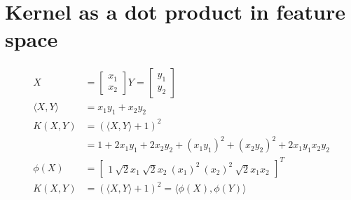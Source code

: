 \documentclass[12pt]{article}
\begin{document}
	\section{Kernel as a dot product in feature space}
	\begin{align*}
		X                    &= \begin{bmatrix}x_1\\x_2\end{bmatrix} Y = \begin{bmatrix}y_1\\y_2\end{bmatrix} \\ 
		\langle X, Y \rangle &= x_1y_1 + x_2y_2\\
		K(X,Y)               &= (\langle X, Y \rangle + 1) ^2 \\
		                     &= 1 + 2x_1y_1 + 2x_2y_2 + (x_1y_1)^2 + (x_2y_2)^2 + 2x_1y_1x_2y_2\\
		\phi(X)              &= \begin{bmatrix}1\ \sqrt{2}x_1\ \sqrt{2}x_2\ (x_1)^2\ (x_2)^2\ \sqrt{2}x_1x_2\end{bmatrix}^T\\
		K(X,Y)               &= (\langle X, Y \rangle + 1) ^2 = \langle \phi(X), \phi(Y) \rangle
	\end{align*}
\end{document}
